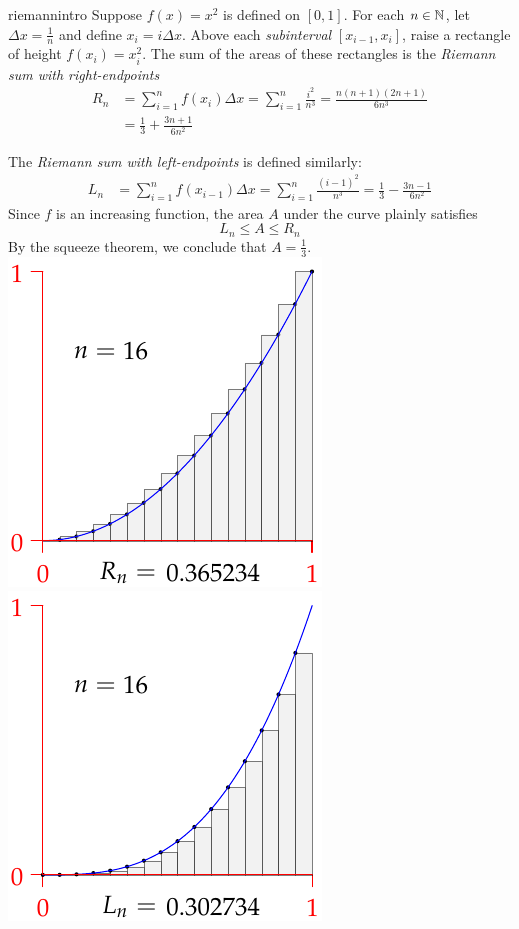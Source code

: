 \begin{example}[lower separated=false, sidebyside, sidebyside align=top seam, sidebyside gap=0pt, righthand width=0.37\linewidth]{}{riemannintro}
	Suppose $f(x)=x^2$ is defined on $[0,1]$.\medbreak
	For each $n\in\mathbb{N}$, let $\Delta x=\frac 1n$ and define $x_i=i\Delta x$.\smallbreak
	Above each \emph{subinterval} $[x_{i-1},x_i]$, raise a rectangle of height $f(x_i)=x_i^2$. The sum of the areas of these rectangles is the \emph{Riemann sum with right-endpoints}\footnotemark
	\begin{align*}
	  R_n&=\sum_{i=1}^n f(x_i)\Delta x 
	  =\sum_{i=1}^n\frac{i^2}{n^3}
	  =\frac{n(n+1)(2n+1)}{6n^3}\\ 
	  &=\frac 13+\frac{3n+1}{6n^2}
	\end{align*}
	
	The \emph{Riemann sum with left-endpoints} is defined similarly:
	\begin{align*}
	  L_n&=\sum_{i=1}^n f(x_{i-1})\Delta x 
	  =\sum_{i=1}^n\frac{(i-1)^2}{n^3} =\frac 13-\frac{3n-1}{6n^2}
	\end{align*}
	Since $f$ is an increasing function, the area $A$ under the curve plainly satisfies
	\[
		L_n\le A\le R_n
	\]
	By the squeeze theorem, we conclude that $A=\frac 13$.
	\tcblower
	\vspace{-5pt}
	\flushright\href{https://www.math.uci.edu/~ndonalds/math140b/riemann.html}{\includegraphics[scale=0.95]{area-up}\smallbreak
	\includegraphics[scale=0.95]{area-down}}
\end{example}

